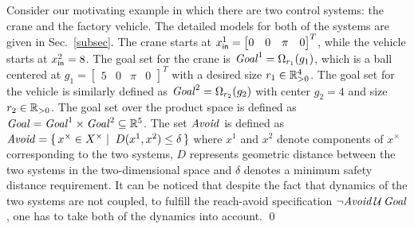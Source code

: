 \begin{example}
	Consider our motivating example in which there are two control systems: the crane and the factory vehicle. The detailed models for both of the systems are given in Sec.~\ref{subsec}. The crane starts at $x_{\mathsf{in}}^1=\begin{bmatrix}0&0&\pi&0\end{bmatrix}^T$, while the vehicle starts at $x_{\mathsf{in}}^2=8$.
	The goal set for the crane is $\mathit{Goal}^1=\Omega_{r_1}(g_1)$, which is a ball centered at $g_1=\begin{bmatrix}5&0&\pi&0\end{bmatrix}^T$ with a desired size $r_1\in\mathbb{R}^4_{> 0}$. %
	The goal set for the vehicle is similarly defined as $\mathit{Goal}^2=\Omega_{r_2}(g_2)$ with center $g_2=4$ and size $r_2\in\mathbb{R}_{> 0}$. The goal set over the product space is defined as $\mathit{Goal}=\mathit{Goal}^1\times\mathit{Goal}^2\subseteq \mathbb{R}^5$. The set $\mathit{Avoid}$ is defined as $\mathit{Avoid}=\set{ x^\times\in X^\times\mid\;D(x^1,x^2)\leq \delta}$ where $x^1$ and $x^2$ denote components of $x^\times$ corresponding to the two systems, $D$ represents geometric distance between the two systems in the two-dimensional space and $\delta$ denotes a minimum safety distance requirement. It can be noticed that despite the fact that dynamics of the two systems are not coupled, to fulfill the reach-avoid specification $\lnot\mathit{Avoid}\, \mathcal{U}\,\mathit{Goal}$, one has to take both of the dynamics into account.
\qed
\end{example}




